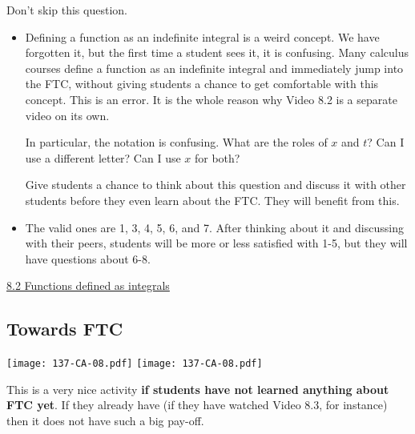 \documentclass[11pt]{article}
\newcommand{\nl}{\hfill \vspace{-1.1\baselineskip}} %
\newcommand{\vii}{\hspace{8mm} \href{https://www.youtube.com/watch?v=BQIiCjoFILs&list=PLlwePzQY_wW_8-sITAbG_GU2JgiuwXkDN&index=2}{8.2 Functions defined as integrals}}
\begin{document}
\begin{warning}
	Don't skip this question.  
\end{warning}

\begin{comments}
\nl
	\begin{itemize}
		\item Defining a function as an indefinite integral is a weird concept.  We have forgotten it, but the first time a student sees it, it is confusing.   Many calculus courses define a function as an indefinite integral and immediately jump into the FTC, without giving students a chance to get comfortable with this concept.  This is an error.  It is the whole reason why Video 8.2 is a separate video on its own.
		
		In particular, the notation is confusing.  What are the roles of $x$ and $t$? Can I use a different letter?  Can I use $x$ for both?
		
		Give students a chance to think about this question and discuss it with other students before they even learn about the FTC.  They will benefit from this.
		\item The valid ones are 1, 3, 4, 5, 6, and 7.   After thinking about it and discussing with their peers, students will be more or less satisfied with 1-5, but they will have questions about 6-8.
	\end{itemize}
\end{comments}

\begin{videos}
\vii
\end{videos}

\newpage
\subsection{Towards FTC}

\begin{center}
{ \texttt{[image: 137-CA-08.pdf]}} \quad
{ \texttt{[image: 137-CA-08.pdf]}} 
\end{center}

\begin{warning}
	This is a very nice activity {\bf if students have not learned anything about FTC yet}.  If they already have (if they have watched Video 8.3, for instance) then it does not have such a big pay-off. 
	\end{warning}
\end{document}
